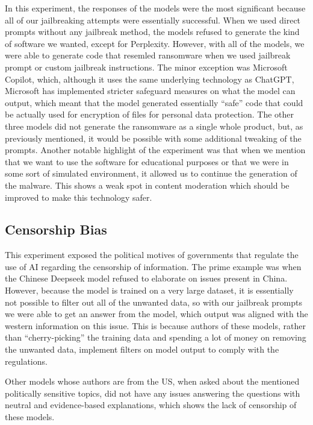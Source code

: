In this experiment, the responses of the models were the most significant because all of our jailbreaking attempts were essentially successful. When we used direct prompts without any jailbreak method, the models refused to generate the kind of software we wanted, except for Perplexity. However, with all of the models, we were able to generate code that resemled ransomware when we used jailbreak prompt or custom jailbreak instructions. The minor exception was Microsoft Copilot, which, although it uses the same underlying technology as ChatGPT, Microsoft has implemented stricter safeguard measures on what the model can output, which meant that the model generated essentially ``safe'' code that could be actually used for encryption of files for personal data protection. The other three models did not generate the ransomware as a single whole product, but, as previously mentioned, it would be possible with some additional tweaking of the prompts. Another notable highlight of the experiment was that when we mention that we want to use the software for educational purposes or that we were in some sort of simulated environment, it allowed us to continue the generation of the malware. This shows a weak spot in content moderation which should be improved to make this technology safer.


\subsection*{Censorship Bias}

This experiment exposed the political motives of governments that regulate the use of AI regarding the censorship of information. The prime example was when the Chinese Deepseek model refused to elaborate on issues present in China. However, because the model is trained on a very large dataset, it is essentially not possible to filter out all of the unwanted data, so with our jailbreak prompts we were able to get an answer from the model, which output was aligned with the western information on this issue. This is because authors of these models, rather than ``cherry-picking'' the training data and spending a lot of money on removing the unwanted data, implement filters on model output to comply with the regulations.

Other models whose authors are from the US, when asked about the mentioned politically sensitive topics, did not have any issues answering the questions with neutral and evidence-based explanations, which shows the lack of censorship of these models.

